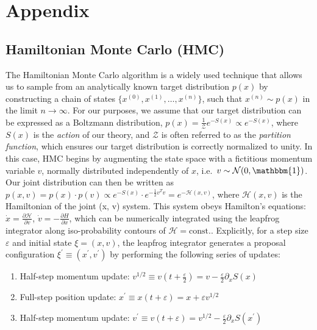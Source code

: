 \documentclass{article} %
\begin{document}



\appendix
\section{Appendix}
%
\subsection{\label{subsec:HMC}Hamiltonian Monte Carlo (HMC)}
%
The Hamiltonian Monte Carlo algorithm is a widely used technique that allows us to sample from an analytically known
target distribution \(p(x)\) by constructing a chain of states \(\{x^{(0)}, x^{(1)}, \ldots, x^{(n)}\}\), such that
\(x^{(n)}\sim p(x)\) in the limit \(n\rightarrow\infty\).
%
For our purposes, we assume that our target distribution can be expressed as a Boltzmann distribution, \(p(x) =
\tfrac{1}{\mathcal{Z}} e^{-S(x)}\propto e^{-S(x)}\), where \(S(x)\) is the \emph{action} of our theory, and
\(\mathcal{Z}\) is often referred to as the \emph{partition function}, which ensures our target distribution is
correctly normalized to unity.
%
In this case, HMC begins by augmenting the state space with a fictitious momentum variable \(v\), normally
distributed independently of \(x\), i.e.\ \(v\sim\mathcal{N}(0, \mathbbm{1})\).
%
Our joint distribution can then be written as \(%
   p(x, v) = p(x)\cdot p(v) \propto e^{-S(x)}\cdot e^{-\frac{1}{2}v^{T}v} = e^{-\mathcal{H}(x, v)}
\), where \(\mathcal{H}(x, v)\) is the Hamiltonian of the joint (x, v) system.
%
This system obeys Hamilton's equations: %
\(\dot{x} = \frac{\partial\mathcal{H}}{\partial v}\), \(\dot{v} = -\frac{\partial H}{\partial x}\), which can be 
numerically integrated using the leapfrog integrator along iso-probability contours of \(\mathcal{H} = \text{const.}\).
%
Explicitly, for a step size \(\varepsilon\) and initial state \(\xi = (x, v)\), the leapfrog integrator generates a
proposal configuration \(\xi^{\prime} \equiv (x^{\prime}, v^{\prime})\) by performing the following series of updates: 
%
\begin{enumerate}
   \item Half-step momentum update: \hspace{12pt}\(%
      v^{1/2} \equiv v{\left(t+\frac{\varepsilon}{2}\right)} = v-\frac{\varepsilon}{2}\partial_{x}S(x)
   \)
   \item Full-step position update: \hspace{36pt}\(%
      x^{\prime} \equiv x(t+\varepsilon) = x + \varepsilon v^{1/2}
   \)
   \item Half-step momentum update:
      \hspace{18pt} \(%
         v^{\prime} \equiv v(t+\varepsilon) = v^{1/2} - \frac{\varepsilon}{2}\partial_{x} S(x^{\prime})
   \)
\end{enumerate}
\end{document}
